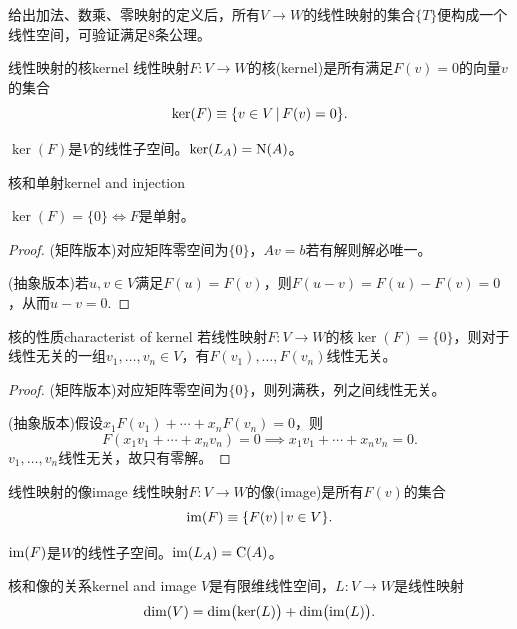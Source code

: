 给出加法、数乘、零映射的定义后，所有$V \to W$的线性映射的集合$\{T\}$便构成一个线性空间，可验证满足8条公理。
\begin{definition}{线性映射的核}{kernel}
	线性映射$F:V \to W$的核(kernel)是所有满足$F(v) = 0$的向量$v$的集合
	\begin{equation}\label{eq:la-kernel-definition}
		\ker(F) \equiv \{v \in V\,\vert\,F(v) = 0\}.
	\end{equation}
\end{definition}
\begin{corollary}
	$\ker(F)$是$V$的线性子空间。$\ker (L_A) = \operatorname{N}(A)$。
\end{corollary}
\begin{theorem}{核和单射}{kernel and injection}
	\begin{center}
		$\ker(F) = \{0\} \iff F$是单射。
	\end{center}
\end{theorem}
\begin{proof}
	(矩阵版本)对应矩阵零空间为$\{0\}$，$Av = b$若有解则解必唯一。
	
	(抽象版本)若$u,v \in V$满足$F(u) = F(v)$，则$F(u - v) = F(u) - F(v) = 0$，从而$u - v = 0.$
\end{proof}
\begin{theorem}{核的性质}{characterist of kernel}
	若线性映射$F:V \to W$的核$\ker(F) = \{0\}$，则对于线性无关的一组$v_1,\ldots,v_n \in V$，有$F(v_1),\ldots,F(v_n)$线性无关。
\end{theorem}
\begin{proof}
	(矩阵版本)对应矩阵零空间为$\{0\}$，则列满秩，列之间线性无关。
	
	(抽象版本)假设$x_1F(v_1) + \cdots + x_nF(v_n) = 0$，则
	\[
		F(x_1v_1 + \cdots + x_nv_n) = 0 \implies x_1v_1 + \cdots + x_nv_n = 0.
	\]
	$v_1,\ldots,v_n$线性无关，故只有零解。
\end{proof}
\begin{definition}{线性映射的像}{image}
	线性映射$F:V \to W$的像(image)是所有$F(v)$的集合
	\begin{equation}\label{eq:la-image-definition}
		\operatorname{im}(F) \equiv \{F(v)\,\vert\,v \in V\}.
	\end{equation}
\end{definition}
\begin{corollary}
	$\operatorname{im}(F)$是$W$的线性子空间。$\operatorname{im}(L_A) = \operatorname{C}(A)$。
\end{corollary}
\begin{theorem}{核和像的关系}{kernel and image}
	$V$是有限维线性空间，$L:V \to W$是线性映射
	\begin{equation}
		\dim(V) = \dim\bigl(\ker(L)\bigr) + \dim\bigl(\operatorname{im}(L)\bigr).
	\end{equation}
\end{theorem}
